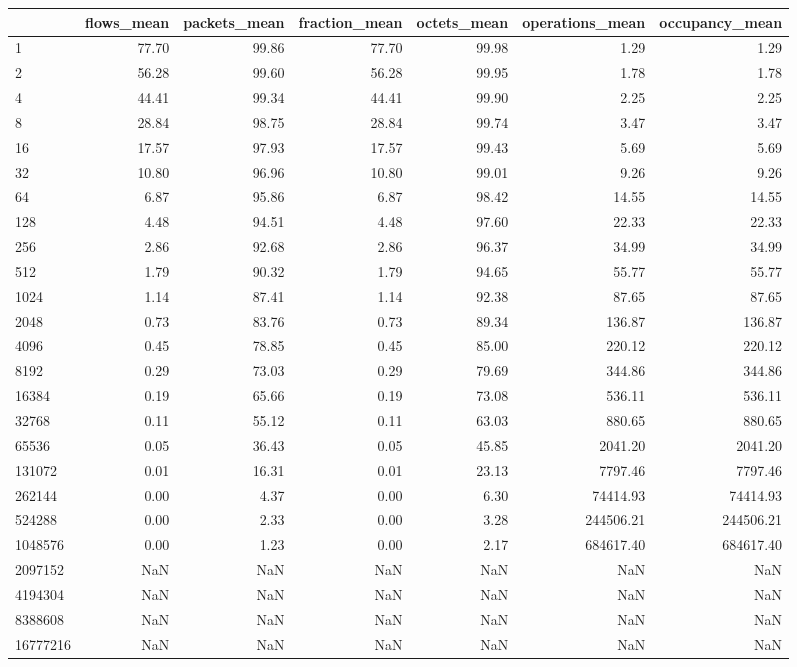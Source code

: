 \begin{tabular}{lrrrrrr}
\toprule
 & flows_mean & packets_mean & fraction_mean & octets_mean & operations_mean & occupancy_mean \\
\midrule
1 & 77.70 & 99.86 & 77.70 & 99.98 & 1.29 & 1.29 \\
2 & 56.28 & 99.60 & 56.28 & 99.95 & 1.78 & 1.78 \\
4 & 44.41 & 99.34 & 44.41 & 99.90 & 2.25 & 2.25 \\
8 & 28.84 & 98.75 & 28.84 & 99.74 & 3.47 & 3.47 \\
16 & 17.57 & 97.93 & 17.57 & 99.43 & 5.69 & 5.69 \\
32 & 10.80 & 96.96 & 10.80 & 99.01 & 9.26 & 9.26 \\
64 & 6.87 & 95.86 & 6.87 & 98.42 & 14.55 & 14.55 \\
128 & 4.48 & 94.51 & 4.48 & 97.60 & 22.33 & 22.33 \\
256 & 2.86 & 92.68 & 2.86 & 96.37 & 34.99 & 34.99 \\
512 & 1.79 & 90.32 & 1.79 & 94.65 & 55.77 & 55.77 \\
1024 & 1.14 & 87.41 & 1.14 & 92.38 & 87.65 & 87.65 \\
2048 & 0.73 & 83.76 & 0.73 & 89.34 & 136.87 & 136.87 \\
4096 & 0.45 & 78.85 & 0.45 & 85.00 & 220.12 & 220.12 \\
8192 & 0.29 & 73.03 & 0.29 & 79.69 & 344.86 & 344.86 \\
16384 & 0.19 & 65.66 & 0.19 & 73.08 & 536.11 & 536.11 \\
32768 & 0.11 & 55.12 & 0.11 & 63.03 & 880.65 & 880.65 \\
65536 & 0.05 & 36.43 & 0.05 & 45.85 & 2041.20 & 2041.20 \\
131072 & 0.01 & 16.31 & 0.01 & 23.13 & 7797.46 & 7797.46 \\
262144 & 0.00 & 4.37 & 0.00 & 6.30 & 74414.93 & 74414.93 \\
524288 & 0.00 & 2.33 & 0.00 & 3.28 & 244506.21 & 244506.21 \\
1048576 & 0.00 & 1.23 & 0.00 & 2.17 & 684617.40 & 684617.40 \\
2097152 & NaN & NaN & NaN & NaN & NaN & NaN \\
4194304 & NaN & NaN & NaN & NaN & NaN & NaN \\
8388608 & NaN & NaN & NaN & NaN & NaN & NaN \\
16777216 & NaN & NaN & NaN & NaN & NaN & NaN \\
\bottomrule
\end{tabular}
